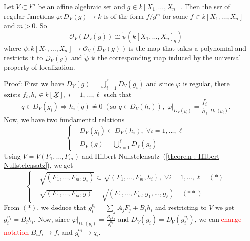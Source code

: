\begin{dang}
    \begin{lemma}\label{lemma: regular functions on principal open sets}
        Let $V\subset k^n$ be an affine algebraic set and $g\in k[X_1,\dots, X_n]$. Then the ser of regular functions 
        $\varphi: D_V(g)\to k$ is of the form $f/g^m$ for some $f\in k[X_1,\dots, X_n]$ and $m>0$. So 
        \begin{equation}
            \mathcal{O}_V(D_V(g)) \cong \widetilde{\psi}(k[X_1,\dots,X_n]_g)
        \end{equation}
        where $\psi: k[X_1,\dots, X_n]\rightarrow \mathcal{O}_V(D_V(g))$ is the map that takes a polynomial 
        and restricts it to $D_V(g)$ and $\widetilde{\psi}$ is the corresponding map induced by the universal
        property of localization. 
    \end{lemma}
\end{dang}
Proof: First we have $D_V(g)=\bigcup_{i=1}^\ell D_V(g_i)$ and since $\varphi$ is regular, there exists 
$f_i, h_i\in k[\underline{X}],\;i=1,\dots,\ell$ such that 
\begin{equation}
    q\in D_V(g_i)\Rightarrow h_i(q)\neq 0\;(\text{so }q\in D_V(h_i)),\;\varphi\big|_{D_V(g_i)}=\frac{f_i}{h_i}\bigg|_{D_V(g_i)}.
\end{equation}
Now, we have two fundamental relations:
\begin{equation}
    \left\{\begin{aligned}
        &D_V(g_i)\subset D_V(h_i),\;\forall i=1,\dots,\ell\\
        &D_V(g)=\bigcup_{i=1}^\ell D_V(g_i)
    \end{aligned}\right.
\end{equation}
Using $V=V(F_1,\dots, F_m)$ and Hilbert Nullstelensatz~(\ref{theorem : Hilbert Nullstelensatz}), we get 
\begin{equation}
    \left\{\begin{aligned}
        &\sqrt{(F_1,\dots,F_m,g_i)}\subset \sqrt{(F_1,\dots,F_m,h_i)},\;\forall i=1,\dots,\ell\quad (*)\\
        &\sqrt{(F_1,\dots,F_m,g)}=\sqrt{(F_1,\dots,F_m,g_1,\dots,g_\ell)}\quad(**)
    \end{aligned}\right.
\end{equation}
From $(*)$, we deduce that $g_i^{n_i}=\sum_j A_jF_j+B_ih_i$ and restricting to $V$ we get 
$g_i^{n_i}=B_ih_i$. Now, since $\varphi\big|_{D_V(g_i)}=\frac{B_i f_i}{g_i^{n_i}}$ and 
$D_V(g_i)=D_V(g_i^{n_i})$, we can \textcolor{red}{change notation} $B_i f_i\to f_i$ and $g_i^{n_i}\to g_i$.\par 

